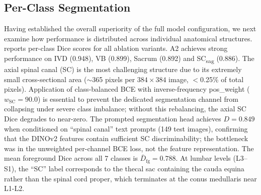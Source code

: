 \documentclass[journal]{IEEEtran}
\begin{document}
\subsection{Per-Class Segmentation}
Having established the overall superiority of the full model configuration, we next examine how performance is distributed across individual anatomical structures.  reports per-class Dice scores for all ablation variants. A2 achieves strong performance on IVD (0.948), VB (0.899), Sacrum (0.892) and SC\textsubscript{sag} (0.886). The axial spinal canal (SC) is the most challenging structure due to its extremely small cross-sectional area ($\sim$365 pixels per $384 \times 384$ image, $<$0.25\% of total pixels).
Application of class-balanced BCE with inverse-frequency pos\_weight ($w_\text{SC}=90.0$) is essential to prevent the dedicated segmentation channel from collapsing under severe class imbalance; without this rebalancing, the axial SC Dice degrades to near-zero. The prompted segmentation head achieves $D=0.849$ when conditioned on ``spinal canal'' text prompts (149 test images), confirming that the DINOv2 features contain sufficient SC discriminability; the bottleneck was in the unweighted per-channel BCE loss, not the feature representation. The mean foreground Dice across all 7 classes is $\bar{D}_{\text{fg}} = 0.788$. At lumbar levels (L3--S1), the ``SC'' label corresponds to the thecal sac containing the cauda equina rather than the spinal cord proper, which terminates at the conus medullaris near L1-L2.

\begin{table}[!htbp]
\centering
\caption{Per-class Dice scores ($D$) on the test set. IVD: intervertebral disc, PE: posterior elements (laminae, pedicles, spinous processes, facet joints), SC: spinal canal, VB: vertebral body. Subscript ``sag'' denotes sagittal variants. $\bar{D}_{\text{fg}}$: mean per-image foreground Dice (each image contributes its mean Dice across applicable foreground classes, then averaged over images); $\bar{D}_{\text{fg}}^{*}$: same computation excluding axial SC.}
\label{tab:perclass}
\end{table}
\end{document}
